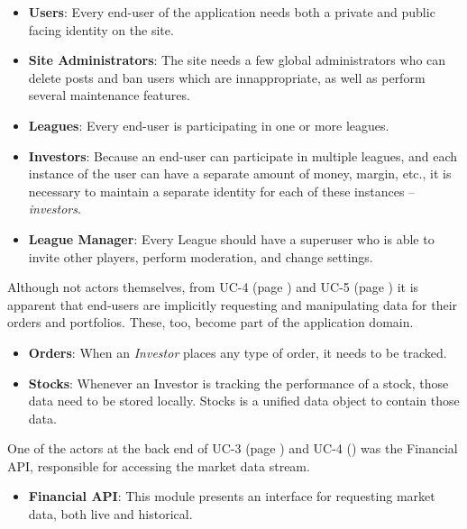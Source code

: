 \begin{itemize}
\item \textbf{Users}: Every end-user of the application needs both a private and
public facing identity on the site.

\item \textbf{Site Administrators}: The site needs a few global administrators
who can delete posts and ban users which are innappropriate, as well
as perform several maintenance features.

\item \textbf{Leagues}: Every end-user is participating in one or more leagues.

\item \textbf{Investors}: Because an end-user can participate in multiple leagues,
and each instance of the user can have a separate amount of money, margin,
etc., it is necessary to maintain a separate identity for each of these 
instances -- \emph{investors}.

\item \textbf{League Manager}: Every League should have a superuser who is 
able to invite other players, perform moderation, and change settings.
\end{itemize}

Although not actors themselves, from UC-4 (page \pageref{UC-4}) and UC-5 
(page \pageref{UC-5}) it is apparent that end-users are implicitly 
requesting and manipulating data for their orders and portfolios. These,
too, become part of the application domain.

\begin{itemize}
\item \textbf{Orders}: When an \emph{Investor} places any type of order, it
needs to be tracked. 
\item \textbf{Stocks}: Whenever an Investor is tracking the performance of a
stock, those data need to be stored locally. Stocks is a unified 
data object to contain those data.
\end{itemize}

One of the actors at the back end of UC-3 (page \pageref{UC-3}) and UC-4
(\pageref{UC-4}) was the Financial API, responsible for accessing the 
market data stream. 

\begin{itemize}
\item \textbf{Financial API}: This module presents an interface for requesting market
data, both live and historical. 
\end{itemize}

